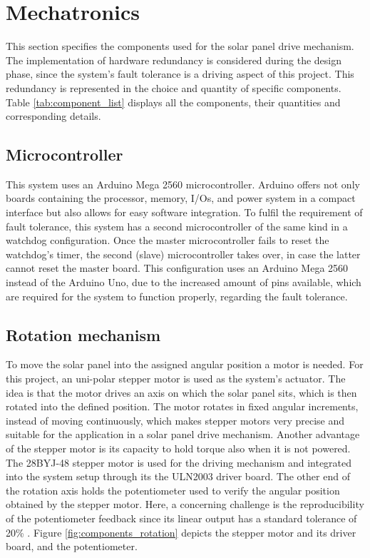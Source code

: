 \section{Mechatronics}
\label{sec:mechatronics}
This section specifies the components used for the solar panel drive mechanism. The implementation of hardware redundancy is considered during the design phase, since the system's fault tolerance is a driving aspect of this project. This redundancy is represented in the choice and quantity of specific components. Table \ref{tab:component_list} displays all the components, their quantities and corresponding details.

\subsection{Microcontroller}
This system uses an Arduino Mega 2560 microcontroller. Arduino offers not only boards containing the processor, memory, I/Os, and power system in a compact interface but also allows for easy software integration. To fulfil the requirement of fault tolerance, this system has a second microcontroller of the same kind in a watchdog configuration. Once the master microcontroller fails to reset the watchdog's timer, the second (slave) microcontroller takes over, in case the latter cannot reset the master board. This configuration uses an Arduino Mega 2560 instead of the Arduino Uno, due to the increased amount of pins available, which are required for the system to function properly, regarding the fault tolerance.

\subsection{Rotation mechanism}
To move the solar panel into the assigned angular position a motor is needed. For this project, an uni-polar stepper motor is used as the system's actuator. The idea is that the motor drives an axis on which the solar panel sits,  which is then rotated into the defined position. The motor rotates in fixed angular increments, instead of moving continuously, which makes stepper motors very precise and suitable for the application in a solar panel drive mechanism. Another advantage of the stepper motor is its capacity to hold torque also when it is not powered. The 28BYJ-48 stepper motor is used for the driving mechanism and integrated into the system setup through its the ULN2003 driver board. The other end of the rotation axis holds the potentiometer used to verify the angular position obtained by the stepper motor. Here, a concerning challenge is the reproducibility of the potentiometer feedback since its linear output has a standard tolerance of 20\% \cite{poti}. Figure \autoref{fig:components_rotation} depicts the stepper motor and its driver board, and the potentiometer.


